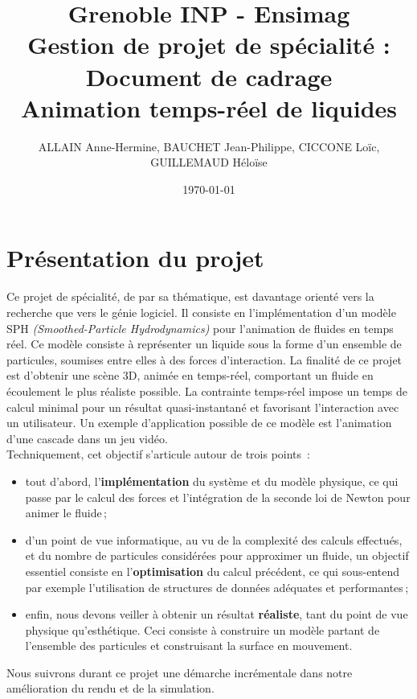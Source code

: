 \documentclass[a4paper,11pt]{article}
\title{\normalsize Grenoble INP - Ensimag \\ Gestion de projet de spécialité : Document de cadrage \\ Animation temps-réel de liquides}
\author{\small ALLAIN Anne-Hermine, BAUCHET Jean-Philippe, CICCONE Loïc, GUILLEMAUD Héloïse}
\date{\small \today}
\begin{document}
\maketitle

\section{Présentation du projet}

Ce projet de spécialité, de par sa thématique, est davantage orienté vers la recherche que vers le génie logiciel. Il consiste en l'implémentation d'un modèle SPH {\em (Smoothed-Particle Hydrodynamics)} pour l'animation de fluides en temps réel. Ce modèle consiste à représenter un liquide sous la forme d'un ensemble de particules, soumises entre elles à des forces d'interaction. La finalité de ce projet est d'obtenir une scène 3D, animée en temps-réel, comportant un fluide en écoulement le plus réaliste possible. La contrainte temps-réel impose un temps de calcul minimal pour un résultat quasi-instantané et favorisant l'interaction avec un utilisateur. Un exemple d'application possible de ce modèle est l'animation d'une cascade dans un jeu vidéo. \\

Techniquement, cet objectif s'articule autour de trois points~: \\

\begin{itemize}
\item tout d'abord, l'\textbf{implémentation} du système et du modèle physique, ce qui passe par le calcul des forces et l'intégration de la seconde loi de Newton pour animer le fluide\,;
\item d'un point de vue informatique, au vu de la complexité des calculs effectués, et du nombre de particules considérées pour approximer un fluide, un objectif essentiel consiste en l'\textbf{optimisation} du calcul précédent, ce qui sous-entend par exemple l'utilisation de structures de données adéquates et performantes\,;
\item enfin, nous devons veiller à obtenir un résultat \textbf{réaliste}, tant du point de vue physique qu'esthétique. Ceci consiste à construire un modèle partant de l'ensemble des particules et construisant la surface en mouvement. \\
\end{itemize}

Nous suivrons durant ce projet une démarche incrémentale dans notre amélioration du rendu et de la simulation. \\
\end{document}
